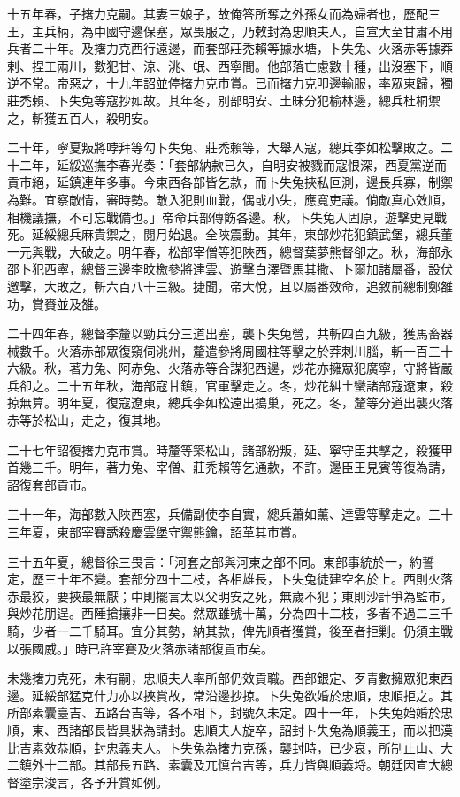 \begin{pinyinscope}
十五年春，子撦力克嗣。其妻三娘子，故俺答所奪之外孫女而為婦者也，歷配三王，主兵柄，為中國守邊保塞，眾畏服之，乃敕封為忠順夫人，自宣大至甘肅不用兵者二十年。及撦力克西行遠邊，而套部莊禿賴等據水塘，卜失兔、火落赤等據莽剌、捏工兩川，數犯甘、涼、洮、氓、西寧間。他部落亡慮數十種，出沒塞下，順逆不常。帝惡之，十九年詔並停撦力克市賞。已而撦力克叩邊輸服，率眾東歸，獨莊禿賴、卜失兔等寇抄如故。其年冬，別部明安、土昧分犯榆林邊，總兵杜桐禦之，斬獲五百人，殺明安。

二十年，寧夏叛將哱拜等勾卜失兔、莊禿賴等，大舉入寇，總兵李如松擊敗之。二十二年，延綏巡撫李春光奏：「套部納款已久，自明安被戮而寇恨深，西夏黨逆而貢市絕，延鎮連年多事。今東西各部皆乞款，而卜失兔挾私叵測，邊長兵寡，制禦為難。宜察敵情，審時勢。敵入犯則血戰，偶或小失，應寬吏議。倘敵真心效順，相機議撫，不可忘戰備也。」帝命兵部傳飭各邊。秋，卜失兔入固原，遊擊史見戰死。延綏總兵麻貴禦之，閱月始退。全陜震動。其年，東部炒花犯鎮武堡，總兵董一元與戰，大破之。明年春，松部宰僧等犯陜西，總督葉夢熊督卻之。秋，海部永邵卜犯西寧，總督三邊李旼檄參將達雲、遊擊白澤暨馬其撒、卜爾加諸屬番，設伏邀擊，大敗之，斬六百八十三級。捷聞，帝大悅，且以屬番效命，追敘前總制鄭雒功，賞賚並及雒。

二十四年春，總督李釐以勁兵分三道出塞，襲卜失兔營，共斬四百九級，獲馬畜器械數千。火落赤部眾復窺伺洮州，釐遣參將周國柱等擊之於莽剌川腦，斬一百三十六級。秋，著力兔、阿赤兔、火落赤等合謀犯西邊，炒花亦擁眾犯廣寧，守將皆嚴兵卻之。二十五年秋，海部寇甘鎮，官軍擊走之。冬，炒花糾土蠻諸部寇遼東，殺掠無算。明年夏，復寇遼東，總兵李如松遠出搗巢，死之。冬，釐等分道出襲火落赤等於松山，走之，復其地。

二十七年詔復撦力克市賞。時釐等築松山，諸部紛叛，延、寧守臣共擊之，殺獲甲首幾三千。明年，著力兔、宰僧、莊禿賴等乞通款，不許。邊臣王見賓等復為請，詔復套部貢市。

三十一年，海部數入陜西塞，兵備副使李自實，總兵蕭如薰、達雲等擊走之。三十三年夏，東部宰賽誘殺慶雲堡守禦熊鑰，詔革其市賞。

三十五年夏，總督徐三畏言：「河套之部與河東之部不同。東部事統於一，約誓定，歷三十年不變。套部分四十二枝，各相雄長，卜失兔徒建空名於上。西則火落赤最狡，要挾最無厭；中則擺言太以父明安之死，無歲不犯；東則沙計爭為監市，與炒花朋逞。西陲搶攘非一日矣。然眾雖號十萬，分為四十二枝，多者不過二三千騎，少者一二千騎耳。宜分其勢，納其款，俾先順者獲賞，後至者拒剿。仍須主戰以張國威。」時已許宰賽及火落赤諸部復貢市矣。

未幾撦力克死，未有嗣，忠順夫人率所部仍效貢職。西部銀定、歹青數擁眾犯東西邊。延綏部猛克什力亦以挾賞故，常沿邊抄掠。卜失兔欲婚於忠順，忠順拒之。其所部素囊臺吉、五路台吉等，各不相下，封號久未定。四十一年，卜失兔始婚於忠順，東、西諸部長皆具狀為請封。忠順夫人旋卒，詔封卜失兔為順義王，而以把漢比吉素效恭順，封忠義夫人。卜失兔為撦力克孫，襲封時，已少衰，所制止山、大二鎮外十二部。其部長五路、素囊及兀慎台吉等，兵力皆與順義埒。朝廷因宣大總督塗宗浚言，各予升賞如例。


\end{pinyinscope}
